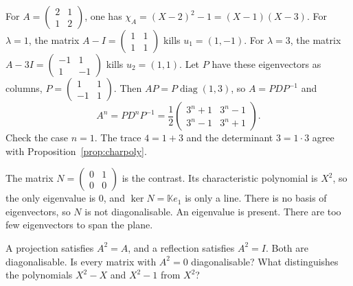 \begin{examplex}
For $A=\begin{pmatrix}2&1\\1&2\end{pmatrix}$, one has $\chi_A=(X-2)^2-1=(X-1)(X-3)$. For $\lambda=1$, the matrix $A-I=\begin{pmatrix}1&1\\1&1\end{pmatrix}$ kills $u_1=(1,-1)$. For $\lambda=3$, the matrix $A-3I=\begin{pmatrix}-1&1\\1&-1\end{pmatrix}$ kills $u_2=(1,1)$. Let $P$ have these eigenvectors as columns, $P=\begin{pmatrix}1&1\\-1&1\end{pmatrix}$. Then $AP=P\operatorname{diag}(1,3)$, so $A=PDP^{-1}$ and
\[
A^n=PD^nP^{-1}=\frac12\begin{pmatrix}3^n+1&3^n-1\\3^n-1&3^n+1\end{pmatrix}.
\]
Check the case $n=1$. The trace $4=1+3$ and the determinant $3=1\cdot3$ agree with Proposition~\ref{prop:charpoly}.

The matrix $N=\begin{pmatrix}0&1\\0&0\end{pmatrix}$ is the contrast. Its characteristic polynomial is $X^2$, so the only eigenvalue is $0$, and $\ker N=\mathbb Ke_1$ is only a line. There is no basis of eigenvectors, so $N$ is not diagonalisable. An eigenvalue is present. There are too few eigenvectors to span the plane.
\end{examplex}

\begin{think}
A projection satisfies $A^2=A$, and a reflection satisfies $A^2=I$. Both are diagonalisable. Is every matrix with $A^2=0$ diagonalisable? What distinguishes the polynomials $X^2-X$ and $X^2-1$ from $X^2$?
\end{think}

